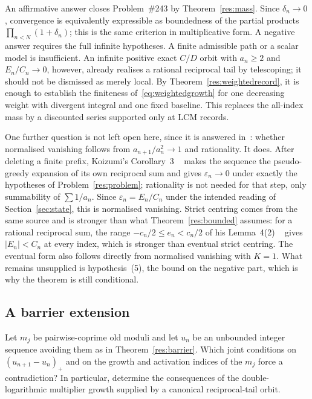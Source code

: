 \noindent An affirmative answer closes Problem~\#243 by
Theorem~\ref{res:mass}.  Since $\delta_n\to0$, convergence is equivalently
expressible as boundedness of the partial products
$\prod_{n<N}(1+\delta_n)$; this is the same criterion in multiplicative form.
A negative answer requires the full infinite hypotheses.  A finite admissible
path or a scalar model is insufficient.  An infinite positive exact $C/D$
orbit with $a_n\ge2$ and $E_n/C_n\to0$, however, already realises a rational
reciprocal tail by telescoping; it should not be dismissed as merely local.
By Theorem~\ref{res:weightedrecord}, it is enough to establish the finiteness
of~\eqref{eq:weightedgrowth} for one decreasing weight with divergent
integral and one fixed baseline. This replaces the all-index mass by a
discounted series supported only at LCM records.

\begin{remark}
One further question is not left open here, since it is answered
in~\cite{koizumi2025}: whether normalised vanishing follows from
$a_{n+1}/a_n^{2}\to1$ and rationality.  It does.  After
deleting a finite prefix, Koizumi's Corollary~3
~\cite[p.~9]{koizumi2025} makes the sequence the pseudo-greedy expansion of its
own reciprocal sum and gives $\varepsilon_n\to0$ under exactly the hypotheses of
Problem~\ref{res:problem}; rationality is not needed for that step, only
summability of $\sum1/a_n$.  Since $\varepsilon_n=E_n/C_n$ under the intended
reading of Section~\ref{sec:state}, this is normalised vanishing.  Strict
centring comes from the same source and is stronger than what
Theorem~\ref{res:bounded} assumes: for a rational reciprocal sum, the range
$-c_n/2\le e_n<c_n/2$ of his Lemma~4(2)
~\cite[p.~11]{koizumi2025} gives $|E_n|<C_n$ at every index, which is stronger
than eventual strict centring.  The eventual form also follows directly from
normalised vanishing with $K=1$.  What remains unsupplied is hypothesis~(5), the bound
on the negative part, which is why the theorem is still conditional.
\end{remark}

\subsection{A barrier extension}

\begin{problem}\label{res:variablerise}
Let $m_j$ be pairwise-coprime old moduli and let $u_n$ be an unbounded
integer sequence avoiding them as in Theorem~\ref{res:barrier}.
Which joint conditions on $(u_{n+1}-u_n)_+$ and on the growth and activation
indices of the $m_j$ force a contradiction?  In particular, determine the
consequences of the double-logarithmic multiplier growth supplied by a
canonical reciprocal-tail orbit.
\end{problem}

